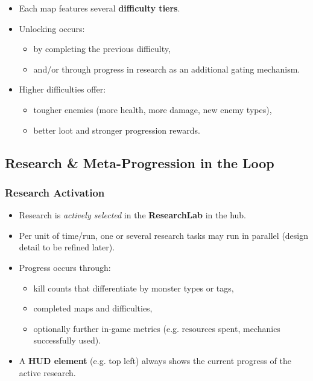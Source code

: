 \begin{itemize}
	\item Each map features several \textbf{difficulty tiers}.
	\item Unlocking occurs:
	\begin{itemize}
		\item by completing the previous difficulty,
		\item and/or through progress in research as an additional gating mechanism.
	\end{itemize}
	\item Higher difficulties offer:
	\begin{itemize}
		\item tougher enemies (more health, more damage, new enemy types),
		\item better loot and stronger progression rewards.
	\end{itemize}
\end{itemize}


\subsection{Research \& Meta-Progression in the Loop}

\subsubsection*{Research Activation}

\begin{itemize}
	\item Research is \emph{actively selected} in the \textbf{ResearchLab} in the hub.
	\item Per unit of time/run, one or several research tasks may run in parallel (design detail to be refined later).
	\item Progress occurs through:
	\begin{itemize}
		\item kill counts that differentiate by monster types or tags,
		\item completed maps and difficulties,
		\item optionally further in-game metrics (e.g. resources spent, mechanics successfully used).
	\end{itemize}
	\item A \textbf{HUD element} (e.g. top left) always shows the current progress of the active research.
\end{itemize}

